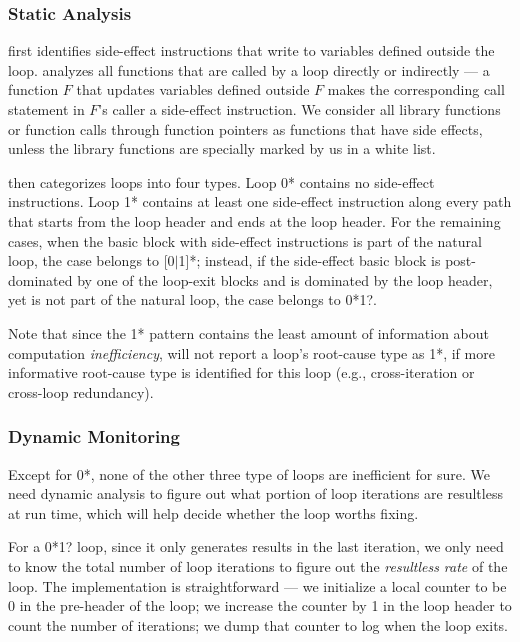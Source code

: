 \subsubsection{Static Analysis}
\label{sec:s_workless}

\Tool first identifies side-effect instructions that write to
variables defined outside the loop. 
\Tool analyzes all functions that are called
by a loop directly or indirectly --- a function $F$ that updates variables
defined outside $F$ makes the corresponding call statement in $F$'s
caller a side-effect instruction.
We consider all library functions or function calls through function pointers 
as functions that have side effects, 
unless the library functions are specially marked by us in a white list.

\Tool then categorizes loops into four types.
Loop 0* contains no side-effect instructions. 
Loop 1* contains at least one side-effect instruction along every path that
starts from the loop header and ends at the loop header.
For the remaining cases, 
when the basic block with side-effect instructions
is part of the natural loop, the case
belongs to [0$|$1]*; instead, if the side-effect basic block is post-dominated
by one of the loop-exit blocks and is dominated by the loop header, yet is
not part of the natural loop, the case belongs to 0*1?.

Note that since the 1* pattern contains the least amount of information
about computation \textit{inefficiency}, \Tool will not report a loop's
root-cause type as 1*, if more informative root-cause type is identified 
for this loop (e.g., cross-iteration or cross-loop redundancy).

\subsubsection{Dynamic Monitoring}
\label{sec:d_workless}

Except for 0*, none of the other three type of loops are inefficient for sure.
We need dynamic analysis to figure out what portion of loop iterations are
resultless at run time, which will help decide whether the loop worths fixing.

For a 0*1? loop, since it only generates results in the last iteration, we 
only need to know the total number of loop iterations 
to figure out the 
\textit{resultless rate} of the loop. The implementation is straightforward
--- we initialize a local counter to be 0 in the pre-header of the loop; we 
increase the counter by 1 in the loop header to count the number of 
iterations; we dump that counter to log when the loop exits.

